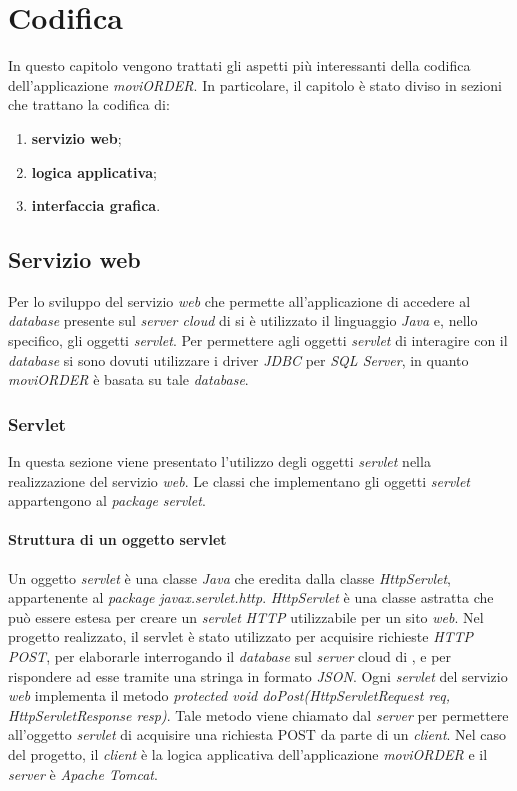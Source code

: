 \chapter{Codifica} \label{codifica}

In questo capitolo vengono trattati gli aspetti più interessanti della codifica dell'applicazione \textit{moviORDER}. In particolare, il capitolo è stato diviso in sezioni che trattano la codifica di:
\begin{enumerate}
	\item \textbf{servizio web};
	\item \textbf{logica applicativa};
	\item \textbf{interfaccia grafica}.
\end{enumerate}

\section{Servizio web} \label{codificaservizio}

Per lo sviluppo del servizio \textit{web} che permette all'applicazione di accedere al \textit{database} presente sul \textit{server cloud} di \visione{} si è utilizzato il linguaggio \textit{Java} e, nello specifico, gli oggetti \textit{servlet}. Per permettere agli oggetti \textit{servlet} di interagire con il \textit{database} si sono dovuti utilizzare i driver \textit{JDBC} per \textit{SQL Server}, in quanto \textit{moviORDER} è basata su tale \textit{database}. 

\subsection{Servlet}

In questa sezione viene presentato l'utilizzo degli oggetti \textit{servlet} nella realizzazione del servizio \textit{web}. Le classi che implementano gli oggetti \textit{servlet} appartengono al \textit{package} \textit{servlet}.

\subsubsection{Struttura di un oggetto servlet}

Un oggetto \textit{servlet} è una classe \textit{Java} che eredita dalla classe \textit{HttpServlet}, appartenente al \textit{package} \textit{javax.servlet.http}. \textit{HttpServlet} è una classe astratta che può essere estesa per creare un \textit{servlet} \textit{HTTP} utilizzabile per un sito \textit{web}. Nel progetto realizzato, il servlet è stato utilizzato per acquisire richieste \textit{HTTP POST}, per elaborarle interrogando il \textit{database} sul \textit{server} cloud di \visione{}, e per rispondere ad esse tramite una stringa in formato \textit{JSON}. Ogni \textit{servlet} del servizio \textit{web} implementa il metodo \textit{protected void doPost(HttpServletRequest req, HttpServletResponse resp)}. Tale metodo viene chiamato dal \textit{server} per permettere all'oggetto \textit{servlet} di acquisire una richiesta POST da parte di un \textit{client}. Nel caso del progetto, il \textit{client} è la logica applicativa dell'applicazione \textit{moviORDER} e il \textit{server} è \textit{Apache Tomcat}.

